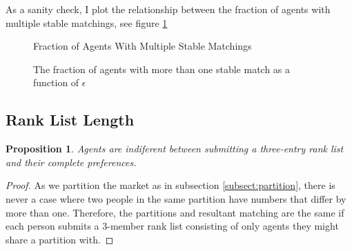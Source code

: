 \documentclass[WP]{AEA}
\newtheorem{prop}{Proposition}
\begin{document}
As a sanity check, I plot the relationship between the fraction of agents with multiple stable matchings, see figure \ref{fig:multi_match}

\begin{figure}[p]{Fraction of Agents With Multiple Stable Matchings}
	\caption{The fraction of agents with more than one stable match as a function of $\epsilon$}
	\label{fig:multi_match}
\end{figure}

\subsection{Rank List Length}

\begin{prop}
	Agents are indiferent between submitting a three-entry rank list and their complete preferences.
\end{prop}

\begin{proof}
	As we partition the market as in subsection \ref{subsect:partition}, there is never a case where two people in the same partition have numbers that differ by more than one. Therefore, the partitions and resultant matching are the same if each person submits a 3-member rank list consisting of only agents they might share a partition with.
\end{proof}







\end{document}
